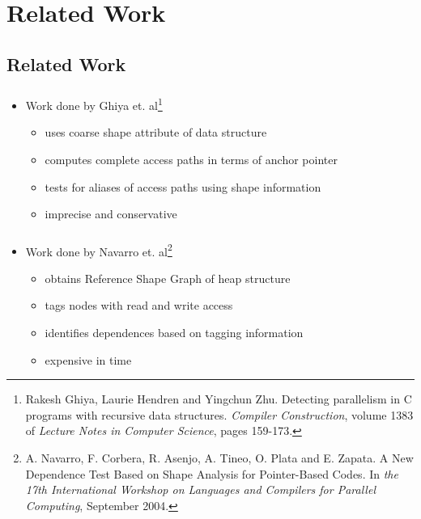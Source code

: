 \documentclass{beamer}
\begin{document}
\section{Related Work}
\subsection{Related Work}
\frame
{
	\frametitle{\subsecname}
	\begin{itemize}
	\item Work done by Ghiya et. al\footnote{Rakesh Ghiya, Laurie Hendren and Yingchun Zhu. Detecting parallelism in C programs with recursive data structures. \emph{Compiler Construction}, volume 1383 of \emph{Lecture Notes in Computer Science}, pages 159-173. }
	\begin{itemize}
	\item uses coarse shape attribute of data structure
	\item computes complete access paths in terms of anchor pointer
	\item tests for aliases of access paths using shape information
	\item imprecise and conservative
	\end{itemize}
	\end{itemize}
}
\frame
{
	\frametitle{\subsecname}
	\begin{itemize}
	\item Work done by Navarro et. al\footnote{A. Navarro, F. Corbera, R. Asenjo, A. Tineo, O. Plata and E. Zapata. A New Dependence Test Based on Shape Analysis for Pointer-Based Codes. In \emph{the 17th International Workshop on Languages and Compilers for Parallel Computing}, September 2004.}
	\begin{itemize}
	\item obtains Reference Shape Graph of heap structure
	\item tags nodes with read and write access
	\item identifies dependences based on tagging information
	\item expensive in time
	\end{itemize}
	\end{itemize}
		
}
\end{document}
